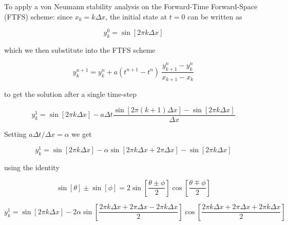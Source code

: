 \documentclass{article}
\begin{document}
\begin{homeworkProblem}

    To apply a von Neumann stability analysis on the Forward-Time Forward-Space
    (FTFS) scheme: since $x_k = k \Delta x$, the initial state at $t = 0$ can
    be written as

    \begin{equation}
        y_k^0 = \sin[2 \pi k \Delta x]
    \end{equation}

    \noindent which we then substitute into the FTFS scheme

    \begin{equation}
        y^{n+1}_k = y^n_k + a(t^{n+1} - t^n)  \
        \frac{y^n_{k+1} - y^n_k}{x_{k+1} - x_k}
    \end{equation}

    \noindent to get the solution after a single time-step

    \begin{equation}
        y_k^1 = \sin[2 \pi k \Delta x] - a \Delta t 
        \frac{\sin[2 \pi (k+1) \Delta x] - \sin[2 \pi k \Delta x]}{\Delta x}
    \end{equation}

    Setting $a \Delta t / \Delta x = \alpha$ we get

    \begin{equation}
        y_k^1 = \sin[2 \pi k \Delta x] -
        \alpha \sin[2 \pi k \Delta x + 2 \pi \Delta x ] - \sin[2 \pi k \Delta x]
    \end{equation}

    \noindent using the identity

    \begin{equation}
        \sin[\theta] \pm \sin[\phi] = 
        2 \sin[\frac{\theta \pm \phi}{2}] \cos[\frac{\theta \mp \phi}{2}]
    \end{equation}

    \begin{equation}
        y_k^1 = \sin[2 \pi k \Delta x] - 2 \alpha
        \sin[\frac{2 \pi k \Delta x + 2 \pi \Delta x - 2 \pi k \Delta x}{2}] 
        \cos[\frac{2 \pi k \Delta x+ 2 \pi \Delta x + 2 \pi k \Delta x}{2}]
    \end{equation}


\end{homeworkProblem}
\end{document}
